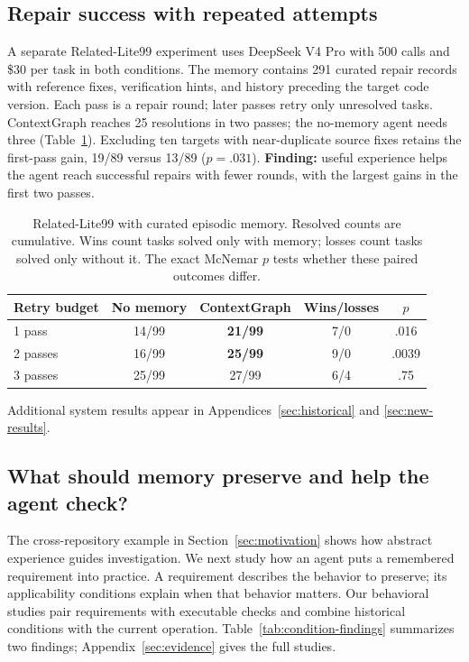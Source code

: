 \documentclass{article}
\begin{document}
\subsection{Repair success with repeated attempts}
\label{sec:retries}
A separate Related-Lite99 experiment uses DeepSeek V4 Pro with 500 calls and
\$30 per task in both conditions. The memory contains 291 curated repair
records with reference fixes, verification hints, and history preceding the
target code version. Each pass is a repair round; later passes retry only
unresolved tasks. ContextGraph reaches 25 resolutions
in two passes; the no-memory agent needs three
(Table~\ref{tab:swectx-stream}). Excluding ten targets with near-duplicate source
fixes retains the first-pass gain, 19/89 versus 13/89 ($p=.031$).
\textbf{Finding:} useful experience helps the agent reach successful repairs
with fewer rounds, with the largest gains in the first two passes.

\begin{table}[t]
\centering
\caption{Related-Lite99 with curated episodic memory.
Resolved counts are cumulative. Wins count tasks solved only with memory;
losses count tasks solved only without it. The exact McNemar $p$ tests whether
these paired outcomes differ.}
\label{tab:swectx-stream}
\begin{tabular}{lcccc}
\toprule
Retry budget & No memory & ContextGraph & Wins/losses & $p$ \\
\midrule
1 pass & 14/99 & \textbf{21/99} & 7/0 & .016 \\
2 passes & 16/99 & \textbf{25/99} & 9/0 & .0039 \\
3 passes & 25/99 & 27/99 & 6/4 & .75 \\
\bottomrule
\end{tabular}
\end{table}

Additional system results appear in Appendices~\ref{sec:historical} and
\ref{sec:new-results}.

\subsection{What should memory preserve and help the agent check?}
\label{sec:behavior-analysis}
The cross-repository example in Section~\ref{sec:motivation} shows how
abstract experience guides investigation. We next study how an agent puts a
remembered requirement into practice. A requirement describes the behavior
to preserve; its applicability conditions explain when that behavior matters.
Our behavioral studies pair requirements with executable checks and combine
historical conditions with the current operation. Table~\ref{tab:condition-findings}
summarizes two findings; Appendix~\ref{sec:evidence} gives the full studies.
\end{document}
